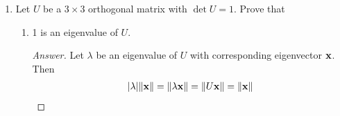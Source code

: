 \documentclass[../psets.tex]{subfiles}
\begin{document}
\begin{enumerate}[label={\textbf{6.\arabic*.}}]
\begin{proof}[Answer]
        \begin{align*}
            1 &= \det U\\
            &= ad-bc\\
            &= \cos\gamma\sin\theta+\sin\gamma\cos\theta\\
            &= \sin(\theta+\gamma)\\
            \theta+\gamma &= \frac{\pi}{2}+2\pi n\\
            \theta &= \frac{\pi}{2}-\gamma+2\pi n
        \end{align*}
        where $n\in\Z$. It follows that
        \begin{align*}
            c &= \cos\theta&
                d &= \sin\theta\\
            &= \cos\left( \frac{\pi}{2}-\gamma+2\pi n \right)&
                &= \sin\left( \frac{\pi}{2}-\gamma+2\pi n \right)\\
            &= \sin(\gamma+2\pi n)&
                &= \cos(\gamma+2\pi n)\\
            &= \sin\gamma&
                &= \cos\gamma
        \end{align*}
        Therefore,
        \begin{equation*}
            U =
            \begin{pmatrix}
                a & b\\
                c & d\\
            \end{pmatrix}
            =
            \begin{pmatrix}
                \cos\gamma & -\sin\gamma\\
                \sin\gamma & \cos\gamma\\
            \end{pmatrix}
            = R_\gamma
        \end{equation*}
        as desired.
    \end{proof}
    \item Let $U$ be a $3\times 3$ orthogonal matrix with $\det U=1$. Prove that
    \begin{enumerate}
        \item 1 is an eigenvalue of $U$.
        \begin{proof}[Answer]
            Let $\lambda$ be an eigenvalue of $U$ with corresponding eigenvector $\mathbf{x}$. Then
            \begin{align*}
                |\lambda|\norm{\x} &= \norm{\lambda\x} = \norm{U\x} = \norm{\x}\\

\end{align*}
\end{proof}
\end{enumerate}
\end{enumerate}
\end{document}
